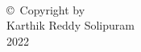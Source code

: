 
\thispagestyle{empty}
\hbox{\ }

\vfill
\renewcommand{\baselinestretch}{1}
\small\normalsize

\vspace{-.65in}

\begin{center}
\large{\copyright \hbox{ }Copyright by\\
Karthik Reddy Solipuram  %
\\
2022}
\end{center}

\vfill
